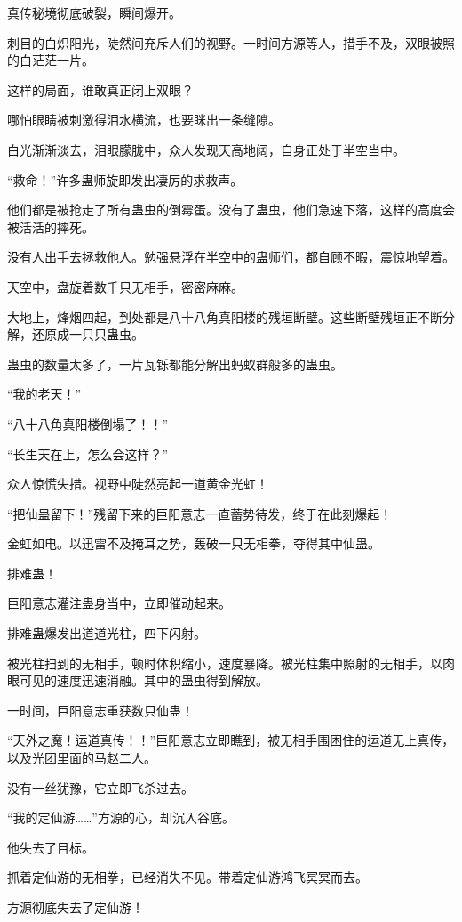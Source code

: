 \begin{this_body}
真传秘境彻底破裂，瞬间爆开。

刺目的白炽阳光，陡然间充斥人们的视野。一时间方源等人，措手不及，双眼被照的白茫茫一片。

这样的局面，谁敢真正闭上双眼？

哪怕眼睛被刺激得泪水横流，也要眯出一条缝隙。

白光渐渐淡去，泪眼朦胧中，众人发现天高地阔，自身正处于半空当中。

“救命！”许多蛊师旋即发出凄厉的求救声。

他们都是被抢走了所有蛊虫的倒霉蛋。没有了蛊虫，他们急速下落，这样的高度会被活活的摔死。

没有人出手去拯救他人。勉强悬浮在半空中的蛊师们，都自顾不暇，震惊地望着。

天空中，盘旋着数千只无相手，密密麻麻。

大地上，烽烟四起，到处都是八十八角真阳楼的残垣断壁。这些断壁残垣正不断分解，还原成一只只蛊虫。

蛊虫的数量太多了，一片瓦铄都能分解出蚂蚁群般多的蛊虫。

“我的老天！”

“八十八角真阳楼倒塌了！！”

“长生天在上，怎么会这样？”

众人惊慌失措。视野中陡然亮起一道黄金光虹！

“把仙蛊留下！”残留下来的巨阳意志一直蓄势待发，终于在此刻爆起！

金虹如电。以迅雷不及掩耳之势，轰破一只无相拳，夺得其中仙蛊。

排难蛊！

巨阳意志灌注蛊身当中，立即催动起来。

排难蛊爆发出道道光柱，四下闪射。

被光柱扫到的无相手，顿时体积缩小，速度暴降。被光柱集中照射的无相手，以肉眼可见的速度迅速消融。其中的蛊虫得到解放。

一时间，巨阳意志重获数只仙蛊！

“天外之魔！运道真传！！”巨阳意志立即瞧到，被无相手围困住的运道无上真传，以及光团里面的马赵二人。

没有一丝犹豫，它立即飞杀过去。

“我的定仙游……”方源的心，却沉入谷底。

他失去了目标。

抓着定仙游的无相拳，已经消失不见。带着定仙游鸿飞冥冥而去。

方源彻底失去了定仙游！


\end{this_body}
